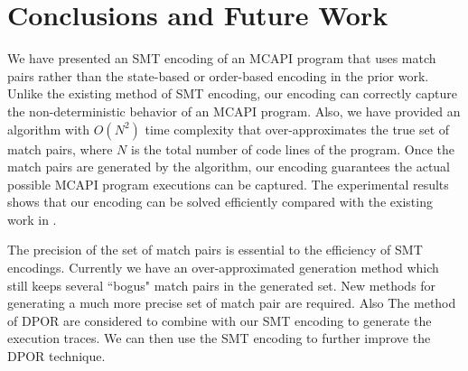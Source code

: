 \section{Conclusions and Future Work}
We have presented an SMT encoding of an MCAPI program that uses match pairs rather than the state-based or order-based encoding in the prior work. Unlike the existing method of SMT encoding, our encoding can correctly capture the non-deterministic behavior of an MCAPI program. Also, we have provided an algorithm with $O(N^2)$ time complexity that over-approximates the true set of match pairs, where $N$ is the total number of code lines of the program. Once the match pairs are generated by the algorithm, our encoding guarantees the actual possible MCAPI program executions can be captured. The experimental results shows that our encoding can be solved efficiently compared with the existing work in \cite{elwakil:padtad10}.

The precision of the set of match pairs is essential to the efficiency of SMT encodings. Currently we have an over-approximated generation method which still keeps several ``bogus" match pairs in the generated set. New methods for generating a much more precise set of match pair are required. Also The method of DPOR are considered to combine with our SMT encoding to generate the execution traces. We can then use the SMT encoding to further improve the DPOR technique.

